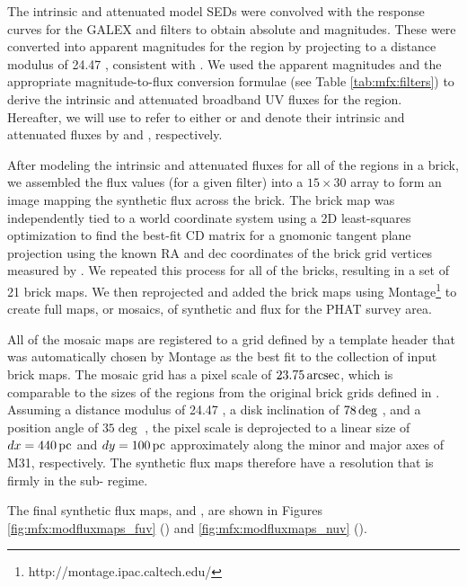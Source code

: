 The intrinsic and attenuated model SEDs were convolved with the response curves
for the GALEX \fuv{} and \nuv{} filters to obtain absolute \fuv{} and \nuv{}
magnitudes. These were converted into apparent magnitudes for the region by
projecting to a distance modulus of 24.47 \citep{McConnachie:2005}, consistent
with \citet{Lewis:2014}. We used the apparent magnitudes and the appropriate
magnitude-to-flux conversion formulae (see Table \ref{tab:mfx:filters}) to
derive the intrinsic and attenuated broadband UV fluxes for the region.
Hereafter, we will use \filter{} to refer to either \fuv{} or \nuv{} and denote
their intrinsic and attenuated fluxes by \fxsfhz{} and \fxsfh{}, respectively.





After modeling the intrinsic and attenuated fluxes for all of the regions in a
brick, we assembled the flux values (for a given filter) into a $15 \times 30$
array to form an image mapping the synthetic flux across the brick. The brick
map was independently tied to a world coordinate system using a 2D
least-squares optimization to find the best-fit CD matrix
\citep{Calabretta:2002} for a gnomonic tangent plane projection using the known
RA and dec coordinates of the brick grid vertices measured by
\citet{Lewis:2014}. We repeated this process for all of the \citet{Lewis:2014}
bricks, resulting in a set of 21 brick maps. We then reprojected and added the
brick maps using Montage\footnote{http://montage.ipac.caltech.edu/} to create
full maps, or mosaics, of synthetic \fuv{} and \nuv{} flux for the PHAT survey
area.

All of the mosaic maps are registered to a grid defined by a template header
that was automatically chosen by Montage as the best fit to the collection of
input brick maps. The mosaic grid has a pixel scale of $23.75\,\mathrm{arcsec}$, which
is comparable to the sizes of the regions from the original brick grids defined
in \citet{Lewis:2014}. Assuming a distance modulus of 24.47
\citep{McConnachie:2005}, a disk inclination of $78\,\mathrm{deg}$ \citep{Tully:1994},
and a position angle of $35\deg$ \citep{deVaucouleurs:1995}, the pixel scale is
deprojected to a linear size of $dx = 440\,\mathrm{pc}$ and $dy = 100\,\mathrm{pc}$ approximately
along the minor and major axes of M31, respectively. The synthetic flux maps
therefore have a resolution that is firmly in the sub-\kpc{} regime.

The final synthetic flux maps, \fxsfhz{} and \fxsfh{}, are shown in Figures
\ref{fig:mfx:modfluxmaps_fuv} (\fuv{}) and \ref{fig:mfx:modfluxmaps_nuv}
(\nuv{}).

